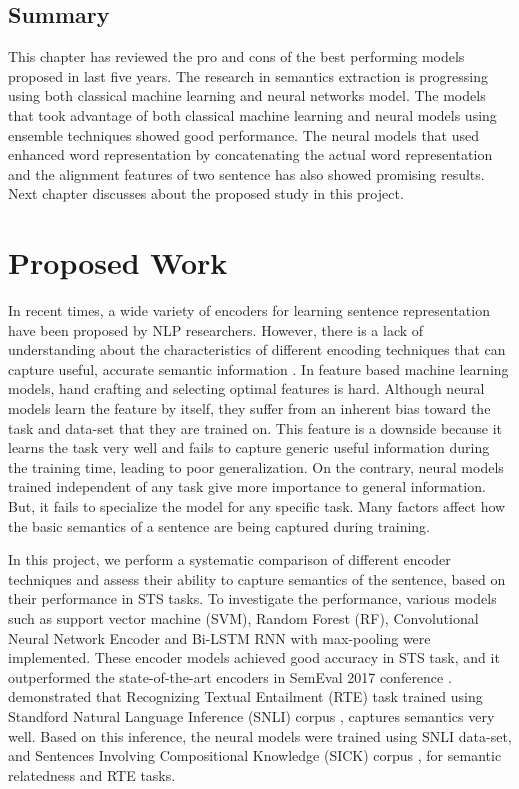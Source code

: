\documentclass[12pt]{report} %
\begin{document}
\section{Summary}

This chapter has reviewed the pro and cons of the best performing models proposed in last five years. The research in semantics extraction is progressing using both classical machine learning and neural networks model. The models that took advantage of both classical machine learning and neural models using ensemble techniques showed good performance. The neural models that used enhanced word representation by concatenating the actual word representation and the alignment features of two sentence has also showed promising results. Next chapter discusses about the proposed study in this project.

\chapter{Proposed Work}
\label{proposed_work}

In recent times, a wide variety of encoders for learning sentence representation have been proposed by NLP researchers. However, there is a lack of understanding about the characteristics of different encoding techniques that can capture useful, accurate semantic information \citep{conneau2017supervised}. In feature based machine learning models, hand crafting and selecting optimal features is hard. Although neural models learn the feature by itself, they suffer from an inherent bias toward the task and data-set that they are trained on.
This feature is a downside because it learns the task very well and fails to capture generic useful information during the training time, leading to poor generalization. On the contrary, neural models trained independent of any task give more importance to general information. But, it fails to specialize the model for any specific task. Many factors affect how the basic semantics of a sentence are being captured during training. 

 In this project, we perform a systematic comparison of different encoder techniques and assess their ability to capture semantics of the sentence, based on their performance in STS tasks. To investigate the performance, various models such as support vector machine (SVM), Random Forest (RF), Convolutional Neural Network Encoder \citep{shao2017hcti} and Bi-LSTM RNN with max-pooling \citep{conneau2017supervised} were implemented. These encoder models achieved good accuracy in STS task, and it outperformed the state-of-the-art encoders in SemEval 2017 conference \citep{cer2017semeval}. \cite{conneau2017supervised} demonstrated that Recognizing Textual Entailment (RTE) task trained using Standford Natural Language Inference (SNLI) corpus  \citep{bowman2015large}, captures semantics very well. Based on this inference, the neural models were trained using SNLI data-set, and Sentences Involving Compositional
 Knowledge (SICK) corpus \citep{marelli2014semeval}, for semantic relatedness and RTE tasks.
 
\end{document}

